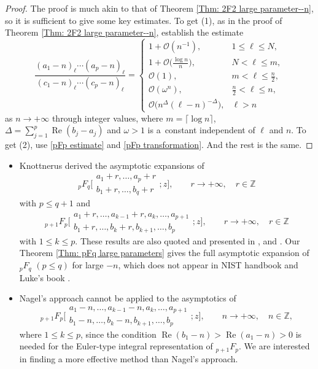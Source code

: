 \documentclass[10pt,a4paper]{amsart}
\numberwithin{equation}{section}
\newcommand{\ZZ}{\ensuremath{\mathbb{Z}}}
\newcommand{\mo}{\mathcal{O}}
\begin{document}
\begin{proof}
	The proof is much akin to that of Theorem \ref{Thm: 2F2 large parameter--n}, so it is sufficient to give some key estimates. To get (1), as in the proof of Theorem \ref{Thm: 2F2 large parameter--n}, establish the estimate
		\[\frac{(a_1-n)_\ell\cdots(a_p-n)_\ell}{(c_1-n)_\ell\cdots(c_p-n)_\ell}=\begin{cases}
			1+\mo(n^{-1}),& 1\leqslant\ell\leqslant N,\\
			\displaystyle 1+\mo\bigg(\frac{\log n}{n}\bigg),& N<\ell\leqslant m,\\
			\mo(1),& m<\ell\leqslant\frac{n}{2},\\
			 \mo(\omega^n),& \frac{n}{2}<\ell\leqslant n,\\
			 \mo\big(n^{\Delta}(\ell-n)^{-\Delta}\big),& \ell>n
		\end{cases}\]
		as $n\to +\infty$ through integer values, where $m=\lceil\log n\rceil$, $\Delta=\sum_{j=1}^{p}\operatorname{Re}(b_j-a_j)$ and $\omega>1$ is a~constant independent of $\ell$ and $n$. To get (2), use \eqref{pFp estimate} and \eqref{pFp transformation}. And the rest is the same.
\end{proof}

\begin{Remark}\quad
\quad
\begin{itemize}\itemsep=0pt
		\item[(1)] Knottnerus \cite{Knottnerus-1960} derived the asymptotic expansions of
		\[{}_pF_q\biggl[\begin{matrix}
			a_1+r,\dots,a_p+r\\
			b_1+r,\dots,b_q+r
		\end{matrix};z\biggr],\qquad r\to +\infty,\quad r\in\ZZ\]
		with $p\leqslant q+1$ and
		\[{}_{p+1}F_p\biggl[\begin{matrix}
			a_1+r,\dots,a_{k-1}+r,a_k,\dots,a_{p+1}\\
			b_1+r,\dots,b_k+r,b_{k+1},\dots,b_p
		\end{matrix};z\biggr],\qquad r\to +\infty,\quad r\in\ZZ\]
		with $1\leqslant k\leqslant p$. These results are also quoted and presented in \cite[Section~7.3]{Luke-1969}, \cite[Ap\-pendix~1]{Nagel-2004} and \cite[Section~16.11\,(iii)]{NIST-Handbook}. Our Theorem \ref{Thm: pFq large parameters} gives the full asymptotic expansion of $_pF_q$ $(p\leqslant q)$ for large $-n$, which does not appear in NIST handbook \cite{NIST-Handbook} and Luke's book \cite{Luke-1969}.
		
		\item[(2)] Nagel's approach cannot be applied to the asymptotics of
		\[{}_{p+1}F_p\biggl[\begin{matrix}
			a_1-n,\dots,a_{k-1}-n,a_k,\dots,a_{p+1}\\
			b_1-n,\dots,b_k-n,b_{k+1},\dots,b_p
		\end{matrix};z\biggr],\qquad n\to +\infty,\quad n\in\ZZ,\]
		where $1\leqslant k\leqslant p$, since the condition $\operatorname{Re}(b_1-n)>\operatorname{Re}(a_1-n)>0$ is needed for the Euler-type integral representation of $_{p+1}F_p$. We are interested in finding a more effective method than Nagel's approach.
	\end{itemize}
\end{Remark}
\end{document}
